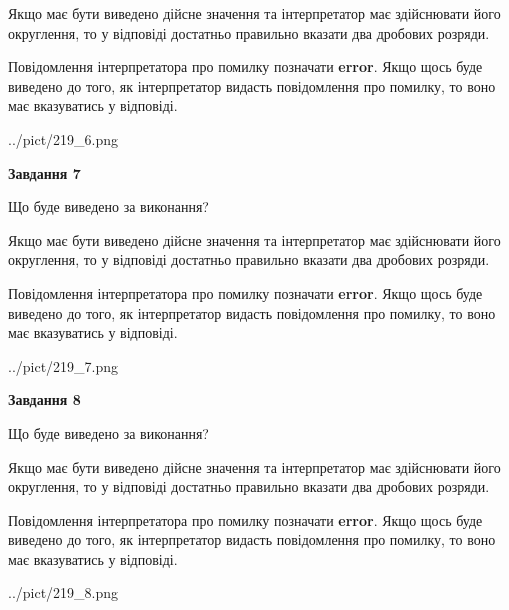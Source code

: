 \documentclass[12pt, ukrainian]{article}
\begin{document}
{\begin {Large}
Якщо має бути виведено дійсне значення та інтерпретатор має здійснювати його округлення, 
то у відповіді достатньо правильно вказати два дробових розряди.

Повідомлення інтерпретатора про помилку позначати \textbf{error}.
Якщо щось буде виведено до того, як інтерпретатор видасть повідомлення про помилку, 
то воно має вказуватись у відповіді. \par

\begin{center}
	{../pict/219_6.png}
\end{center}
\newpage

{\begin {center}\textbf{Завдання 7}\end {center}}\par
Що буде виведено за виконання? \par

Якщо має бути виведено дійсне значення та інтерпретатор має здійснювати його округлення, 
то у відповіді достатньо правильно вказати два дробових розряди.

Повідомлення інтерпретатора про помилку позначати \textbf{error}.
Якщо щось буде виведено до того, як інтерпретатор видасть повідомлення про помилку, 
то воно має вказуватись у відповіді. \par

\begin{center}
	{../pict/219_7.png}
\end{center}
\newpage

{\begin {center}\textbf{Завдання 8}\end {center}}\par
Що буде виведено за виконання? \par

Якщо має бути виведено дійсне значення та інтерпретатор має здійснювати його округлення, 
то у відповіді достатньо правильно вказати два дробових розряди.

Повідомлення інтерпретатора про помилку позначати \textbf{error}.
Якщо щось буде виведено до того, як інтерпретатор видасть повідомлення про помилку, 
то воно має вказуватись у відповіді. \par

\begin{center}
	{../pict/219_8.png}
\end{center}
\newpage


\end{Large}}
\end{document}
